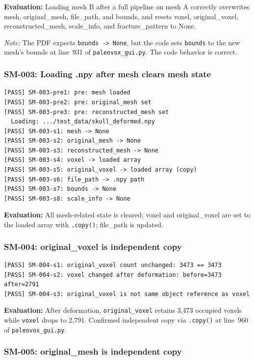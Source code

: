 \documentclass[12pt,a4paper]{article}
\begin{document}
\textbf{Evaluation:} Loading mesh B after a full pipeline on mesh A correctly
overwrites mesh, original\_mesh, file\_path, and bounds, and resets voxel,
original\_voxel, reconstructed\_mesh, scale\_info, and fracture\_pattern to None.

\smallskip
\textit{Note:} The PDF expects \texttt{bounds -> None}, but the code sets
\texttt{bounds} to the new mesh's bounds at line~931 of \texttt{paleovox\_gui.py}.
The code behavior is correct.

\subsubsection{SM-003: Loading .npy after mesh clears mesh state}

\begin{lstlisting}
[PASS] SM-003-pre1: pre: mesh loaded
[PASS] SM-003-pre2: pre: original_mesh set
[PASS] SM-003-pre3: pre: reconstructed_mesh set
  Loading: .../test_data/skull_deformed.npy
[PASS] SM-003-s1: mesh -> None
[PASS] SM-003-s2: original_mesh -> None
[PASS] SM-003-s3: reconstructed_mesh -> None
[PASS] SM-003-s4: voxel -> loaded array
[PASS] SM-003-s5: original_voxel -> loaded array (copy)
[PASS] SM-003-s6: file_path -> .npy path
[PASS] SM-003-s7: bounds -> None
[PASS] SM-003-s8: scale_info -> None
\end{lstlisting}

\textbf{Evaluation:} All mesh-related state is cleared; voxel and original\_voxel
are set to the loaded array with \texttt{.copy()}; file\_path is updated.

\subsubsection{SM-004: original\_voxel is independent copy}

\begin{lstlisting}
[PASS] SM-004-s1: original_voxel count unchanged: 3473 == 3473
[PASS] SM-004-s2: voxel changed after deformation: before=3473 after=2791
[PASS] SM-004-s3: original_voxel is not same object reference as voxel
\end{lstlisting}

\textbf{Evaluation:} After deformation, \texttt{original\_voxel} retains 3,473
occupied voxels while \texttt{voxel} drops to 2,791. Confirmed independent copy
via \texttt{.copy()} at line~960 of \texttt{paleovox\_gui.py}.

\subsubsection{SM-005: original\_mesh is independent copy}
\end{document}
